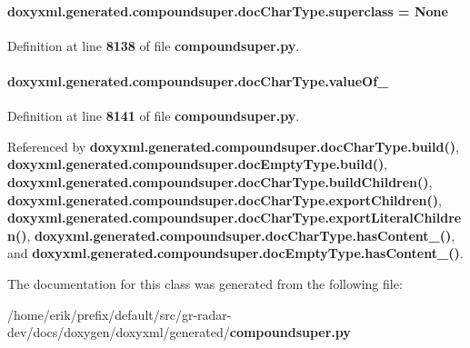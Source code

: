 \paragraph[{superclass}]{\setlength{\rightskip}{0pt plus 5cm}doxyxml.\+generated.\+compoundsuper.\+doc\+Char\+Type.\+superclass = None\hspace{0.3cm}{\ttfamily [static]}}\label{classdoxyxml_1_1generated_1_1compoundsuper_1_1docCharType_afd6df94db68c05d9a16ec7558d0a3836}


Definition at line {\bf 8138} of file {\bf compoundsuper.\+py}.

\paragraph[{value\+Of\+\_\+}]{\setlength{\rightskip}{0pt plus 5cm}doxyxml.\+generated.\+compoundsuper.\+doc\+Char\+Type.\+value\+Of\+\_\+}\label{classdoxyxml_1_1generated_1_1compoundsuper_1_1docCharType_a385fdc503dbd1aaab399ebe4821184ec}


Definition at line {\bf 8141} of file {\bf compoundsuper.\+py}.



Referenced by {\bf doxyxml.\+generated.\+compoundsuper.\+doc\+Char\+Type.\+build()}, {\bf doxyxml.\+generated.\+compoundsuper.\+doc\+Empty\+Type.\+build()}, {\bf doxyxml.\+generated.\+compoundsuper.\+doc\+Char\+Type.\+build\+Children()}, {\bf doxyxml.\+generated.\+compoundsuper.\+doc\+Char\+Type.\+export\+Children()}, {\bf doxyxml.\+generated.\+compoundsuper.\+doc\+Char\+Type.\+export\+Literal\+Children()}, {\bf doxyxml.\+generated.\+compoundsuper.\+doc\+Char\+Type.\+has\+Content\+\_\+()}, and {\bf doxyxml.\+generated.\+compoundsuper.\+doc\+Empty\+Type.\+has\+Content\+\_\+()}.



The documentation for this class was generated from the following file\+:\begin{DoxyCompactItemize}
\item 
/home/erik/prefix/default/src/gr-\/radar-\/dev/docs/doxygen/doxyxml/generated/{\bf compoundsuper.\+py}\end{DoxyCompactItemize}
